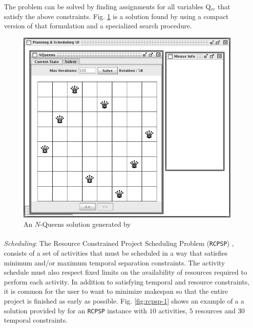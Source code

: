 {The problem can be solved by finding assignments for all variables
Q$_{rc}$ that satisfy the above constraints. Fig. \ref{fig:nqueens-2}
is a solution found by \eu using a compact version of that formulation
and a specialized search procedure.

\begin{figure}
\centering
\includegraphics[scale=0.3]{figs/Example-NQueens1.jpg}
\caption{\small An $N$-Queens solution generated by \eu}
\label{fig:nqueens-2}
\end{figure}


\paragraph{} \textit{Scheduling}: The Resource Constrained Project
Scheduling Problem (\texttt{RCPSP}) \cite{Bruckera99}, consists of a
set of activities that must be scheduled in a way that satisfies
minimum and/or maximum temporal separation constraints. The activity
schedule must also respect fixed limits on the availability of
resources required to perform each activity. In addition to satisfying
temporal and resource constraints, it is common for the user to want
to minimize makespan \cite{ghallab04} so that the entire project is
finished as early as possible. Fig. \ref{fig:rcpsp-1} shows an example
of a a solution provided by \eu for an \texttt{RCPSP} instance with
$10$ activities, $5$ resources and $30$ temporal constraints.

}

